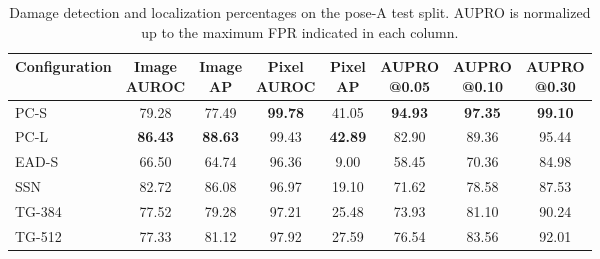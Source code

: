 \begin{table}[ht!]
    \centering
    \small
    \setlength{\tabcolsep}{3.5pt}
    \begin{tabular}{@{}l c c c c c c c@{}}
        \toprule
        \textbf{Configuration}                      &
        \shortstack{\textbf{Image}\\\textbf{AUROC}} &
        \shortstack{\textbf{Image}\\\textbf{AP}}    &
        \shortstack{\textbf{Pixel}\\\textbf{AUROC}} &
        \shortstack{\textbf{Pixel}\\\textbf{AP}}    &
        \shortstack{\textbf{AUPRO}\\\textbf{@0.05}} &
        \shortstack{\textbf{AUPRO}\\\textbf{@0.10}} &
        \shortstack{\textbf{AUPRO}\\\textbf{@0.30}}                                                                                                                        \\
        \midrule
        \midrule
        PC-S                                        & 79.28          & 77.49          & \textbf{99.78} & 41.05          & \textbf{94.93} & \textbf{97.35} & \textbf{99.10} \\
        PC-L                                        & \textbf{86.43} & \textbf{88.63} & 99.43          & \textbf{42.89} & 82.90          & 89.36          & 95.44          \\
        EAD-S                                       & 66.50          & 64.74          & 96.36          & 9.00           & 58.45          & 70.36          & 84.98          \\
        SSN                                         & 82.72          & 86.08          & 96.97          & 19.10          & 71.62          & 78.58          & 87.53          \\
        TG-384                                      & 77.52          & 79.28          & 97.21          & 25.48          & 73.93          & 81.10          & 90.24          \\
        TG-512                                      & 77.33          & 81.12          & 97.92          & 27.59          & 76.54          & 83.56          & 92.01          \\
        \bottomrule
    \end{tabular}
    \vspace{5mm}
    \caption{Damage detection and localization percentages on the pose-A test split. AUPRO is normalized up to the maximum FPR indicated in each column.}
    \label{tab:damage-reference-test-results}
\end{table}

